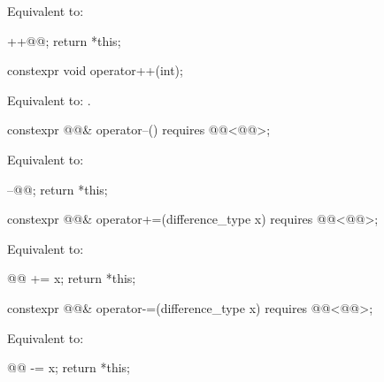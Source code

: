 \begin{itemdescr}
\pnum
\effects
Equivalent to:
\begin{codeblock}
++@@;
return *this;
\end{codeblock}
\end{itemdescr}

%
\begin{itemdecl}
constexpr void operator++(int);
\end{itemdecl}

\begin{itemdescr}
\pnum
\effects
Equivalent to: .
\end{itemdescr}

%
\begin{itemdecl}
constexpr @@& operator--() requires @@<@@>;
\end{itemdecl}

\begin{itemdescr}
\pnum
\effects
Equivalent to:
\begin{codeblock}
--@@;
return *this;
\end{codeblock}
\end{itemdescr}

%
\begin{itemdecl}
constexpr @@& operator+=(difference_type x)
  requires @@<@@>;
\end{itemdecl}

\begin{itemdescr}
\pnum
\effects
Equivalent to:
\begin{codeblock}
@@ += x;
return *this;
\end{codeblock}
\end{itemdescr}

%
\begin{itemdecl}
constexpr @@& operator-=(difference_type x)
  requires @@<@@>;
\end{itemdecl}

\begin{itemdescr}
\pnum
\effects
Equivalent to:
\begin{codeblock}
@@ -= x;
return *this;
\end{codeblock}
\end{itemdescr}

